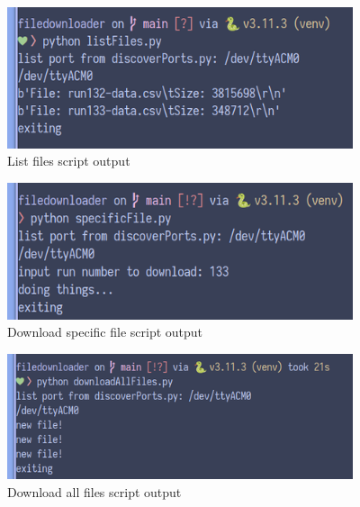 \begin{figure}[H]
    \centering
    \includegraphics[width=4in]{images/list.png}
    \caption{List files script output}
    \label{fig:list}
\end{figure}
\begin{figure}[H]
    \centering
    \includegraphics[width=4in]{images/specific.png}
    \caption{Download specific file script output}
    \label{fig:specific}
\end{figure}
\begin{figure}[H]
    \centering
    \includegraphics[width=4in]{images/all.png}
    \caption{Download all files script output}
    \label{fig:all}
\end{figure}
